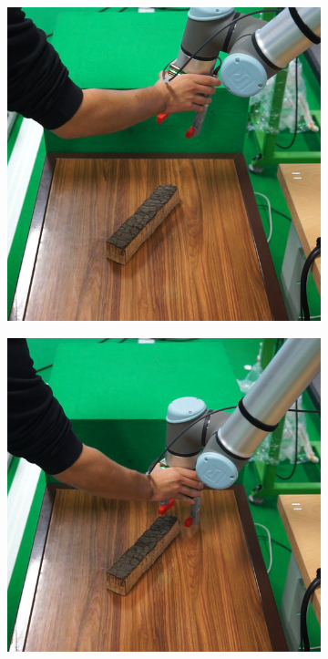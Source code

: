 \begin{figure}[h]
\begin{subfigure}{.2\linewidth}
    \end{subfigure}%
    \begin{subfigure}{.2\linewidth}
        \centering
        \includegraphics[width=.95\linewidth]{figs/chp6/hg_test_2.jpg}
    \end{subfigure}%
    \begin{subfigure}{.2\linewidth}
        \centering
        \includegraphics[width=.95\linewidth]{figs/chp6/hg_test_3.jpg}

\end{subfigure}
\end{figure}
